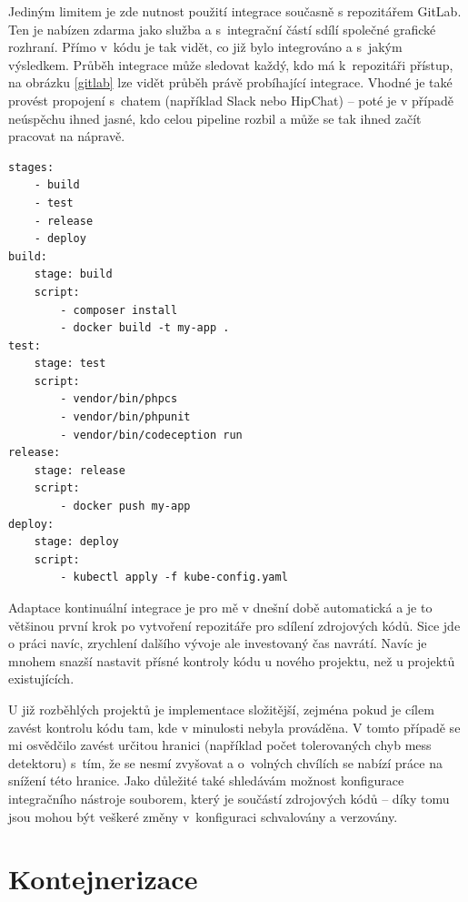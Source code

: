 \documentclass[FM,DP]{tulthesis}
\newenvironment{code}
    {\filbreak\captionsetup{type=listing}}{\filbreak}
\begin{document}
Jediným limitem je zde nutnost použití integrace současně s repozitářem GitLab. Ten je nabízen zdarma jako služba
a s~integrační částí sdílí společné grafické rozhraní. Přímo v~kódu je tak vidět, co již bylo
integrováno a s~jakým výsledkem. Průběh integrace může sledovat každý, kdo má k~repozitáři přístup, 
na obrázku \ref{gitlab} lze vidět průběh právě probíhající integrace. Vhodné je také provést propojení
s~chatem (například Slack nebo HipChat) -- poté je v případě neúspěchu ihned jasné, kdo celou
pipeline rozbil a může se tak ihned začít pracovat na nápravě. 

\begin{code}
\captionsetup{singlelinecheck=false,justification=raggedright}
\label{code:gitlab}
\begin{verbatim}
stages:
    - build
    - test
    - release
    - deploy
build:
    stage: build
    script:
        - composer install
        - docker build -t my-app .
test:
    stage: test
    script:
        - vendor/bin/phpcs
        - vendor/bin/phpunit
        - vendor/bin/codeception run
release:
    stage: release
    script:
        - docker push my-app
deploy:
    stage: deploy
    script:
        - kubectl apply -f kube-config.yaml
\end{verbatim}
\end{code}

Adaptace kontinuální integrace je pro mě v dnešní době automatická a je to většinou první krok po vytvoření
repozitáře pro sdílení zdrojových kódů. Sice jde o práci navíc, zrychlení dalšího vývoje ale investovaný čas 
navrátí. Navíc je mnohem snazší nastavit přísné kontroly kódu u nového projektu, než u projektů existujících.

U již rozběhlých projektů je implementace složitější, zejména pokud
je cílem zavést kontrolu kódu tam, kde v minulosti nebyla prováděna. V tomto případě se mi osvědčilo 
zavést určitou hranici (například počet tolerovaných chyb mess detektoru) s~tím, že se nesmí zvyšovat
a o~volných chvílích se nabízí práce na snížení této hranice. Jako důležité také shledávám možnost konfigurace
integračního nástroje souborem, který je součástí zdrojových kódů -- díky tomu jsou mohou být veškeré změny 
v~konfiguraci schvalovány a verzovány.

\section{Kontejnerizace}
\end{document}
